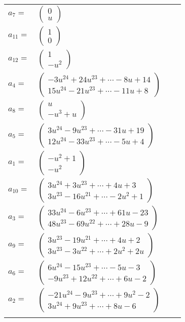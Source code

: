 \documentclass[1p]{elsarticle_modified}
\theoremstyle{definition}
\begin{document}
\begin{tabular}{m{7pt} m{180pt} m{7pt} m{180pt} }
\flushright $a_{7}=$&$\begin{pmatrix}0\\u\end{pmatrix}$ \\
\flushright $a_{11}=$&$\begin{pmatrix}1\\0\end{pmatrix}$ \\
\flushright $a_{12}=$&$\begin{pmatrix}1\\- u^2\end{pmatrix}$ \\
\flushright $a_{4}=$&$\begin{pmatrix}-3 u^{24}+24 u^{23}+\cdots-8 u+14\\15 u^{24}-21 u^{23}+\cdots-11 u+8\end{pmatrix}$ \\
\flushright $a_{8}=$&$\begin{pmatrix}u\\- u^3+u\end{pmatrix}$ \\
\flushright $a_{5}=$&$\begin{pmatrix}3 u^{24}-9 u^{23}+\cdots-31 u+19\\12 u^{24}-33 u^{23}+\cdots-5 u+4\end{pmatrix}$ \\
\flushright $a_{1}=$&$\begin{pmatrix}- u^2+1\\- u^2\end{pmatrix}$ \\
\flushright $a_{10}=$&$\begin{pmatrix}3 u^{24}+3 u^{23}+\cdots+4 u+3\\3 u^{23}-16 u^{21}+\cdots-2 u^2+1\end{pmatrix}$ \\
\flushright $a_{3}=$&$\begin{pmatrix}33 u^{24}-6 u^{23}+\cdots+61 u-23\\48 u^{23}-69 u^{22}+\cdots+28 u-9\end{pmatrix}$ \\
\flushright $a_{9}=$&$\begin{pmatrix}3 u^{23}-19 u^{21}+\cdots+4 u+2\\3 u^{23}-3 u^{22}+\cdots+2 u^2+2 u\end{pmatrix}$ \\
\flushright $a_{6}=$&$\begin{pmatrix}6 u^{24}-15 u^{23}+\cdots-5 u-3\\-9 u^{23}+12 u^{22}+\cdots+6 u-2\end{pmatrix}$ \\
\flushright $a_{2}=$&$\begin{pmatrix}-21 u^{24}-9 u^{23}+\cdots+9 u^2-2\\3 u^{24}+9 u^{23}+\cdots+8 u-6\end{pmatrix}$\\&\end{tabular}
\end{document}
